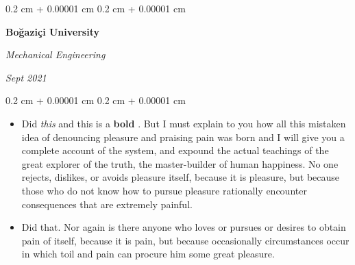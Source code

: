 \documentclass[10pt, letterpaper]{article}
\newenvironment{highlights}{
    \begin{itemize}[
        topsep=0.10 cm,
        parsep=0.10 cm,
        partopsep=0pt,
        itemsep=0pt,
        leftmargin=0.4 cm + 10pt
    ]
}{
    \end{itemize}
} %
\newenvironment{onecolentry}{
    \begin{adjustwidth}{
        0.2 cm + 0.00001 cm
    }{
        0.2 cm + 0.00001 cm
    }
}{
    \end{adjustwidth}
} %
\newenvironment{twocolentry}[2][]{
    \onecolentry
    \def\secondColumn{#2}
    \setcolumnwidth{\fill, 4.5 cm}
    \begin{paracol}{2}
}{
    \switchcolumn \raggedleft \secondColumn
    \end{paracol}
    \endonecolentry
} %
\let\hrefWithoutArrow\href
\renewcommand{\href}[2]{\hrefWithoutArrow{#1}{\ifthenelse{\equal{#2}{}}{ }{#2 }\raisebox{.15ex}{\footnotesize \faExternalLink*}}}
\begin{document}
        \vspace{0.2 cm}

        \begin{twocolentry}{
            
            
        \textit{Sept 2021}}
            \textbf{Boğaziçi University}

            \textit{Mechanical Engineering}
        \end{twocolentry}
        \vspace{0.10 cm}
        \begin{onecolentry}
            \begin{highlights}
                \item Did \textit{this} and this is a \textbf{bold} \href{https://example.com}{link}. But I must explain to you how all this mistaken idea of denouncing pleasure and praising pain was born and I will give you a complete account of the system, and expound the actual teachings of the great explorer of the truth, the master-builder of human happiness. No one rejects, dislikes, or avoids pleasure itself, because it is pleasure, but because those who do not know how to pursue pleasure rationally encounter consequences that are extremely painful.
                \item Did that. Nor again is there anyone who loves or pursues or desires to obtain pain of itself, because it is pain, but because occasionally circumstances occur in which toil and pain can procure him some great pleasure.
            \end{highlights}
        \end{onecolentry}


        \vspace{0.2 cm}
\end{document}
